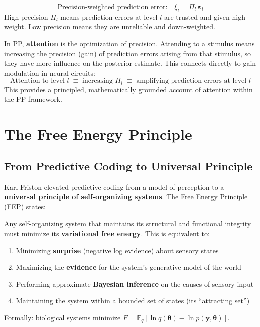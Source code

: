 \documentclass[11pt,a4paper]{report}
\begin{document}
\begin{mathbox}
\vspace{-6pt}
\[
  \text{Precision-weighted prediction error:}\quad \xi_l = \Pi_l\, \boldsymbol{\varepsilon}_l
\]
High precision $\Pi_l$ means prediction errors at level $l$ are trusted and given high weight. Low precision means they are unreliable and down-weighted.
\vspace{-4pt}
\end{mathbox}

\begin{principlebox}
In PP, \textbf{attention} is the optimization of precision. Attending to a stimulus means increasing the precision (gain) of prediction errors arising from that stimulus, so they have more influence on the posterior estimate. This connects directly to gain modulation in neural circuits:
\[
  \text{Attention to level } l \;\equiv\; \text{increasing } \Pi_l \;\equiv\; \text{amplifying prediction errors at level } l
\]
This provides a principled, mathematically grounded account of attention within the PP framework.
\end{principlebox}


\chapter{The Free Energy Principle}

\section{From Predictive Coding to Universal Principle}

Karl Friston elevated predictive coding from a model of perception to a \textbf{universal principle of self-organizing systems}. The Free Energy Principle (FEP) states:

\begin{fepbox}
Any self-organizing system that maintains its structural and functional integrity must minimize its \textbf{variational free energy}. This is equivalent to:
\begin{enumerate}[leftmargin=1.5em]
  \item Minimizing \textbf{surprise} (negative log evidence) about sensory states
  \item Maximizing the \textbf{evidence} for the system's generative model of the world
  \item Performing approximate \textbf{Bayesian inference} on the causes of sensory input
  \item Maintaining the system within a bounded set of states (its ``attracting set'')
\end{enumerate}
Formally: biological systems minimize $F = \mathbb{E}_q[\ln q(\boldsymbol{\theta}) - \ln p(\mathbf{y}, \boldsymbol{\theta})]$.
\end{fepbox}
\end{document}
